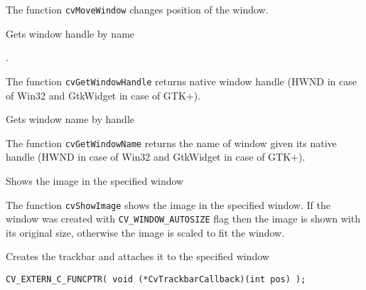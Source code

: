 The function \texttt{cvMoveWindow} changes position of the window.


Gets window handle by name


\begin{description}
.
\end{description}

The function \texttt{cvGetWindowHandle} returns native window handle (HWND in case of Win32 and GtkWidget in case of GTK+).


Gets window name by handle


\begin{description}
\end{description}

The function \texttt{cvGetWindowName} returns the name of window given its native handle (HWND in case of Win32 and GtkWidget in case of GTK+).


Shows the image in the specified window


\begin{description}
\end{description}

The function \texttt{cvShowImage} shows the image in the specified window. If the window was created with \texttt{CV\_WINDOW\_AUTOSIZE} flag then the image is shown with its original size, otherwise the image is scaled to fit the window.


Creates the trackbar and attaches it to the specified window

\begin{lstlisting}
CV_EXTERN_C_FUNCPTR( void (*CvTrackbarCallback)(int pos) );
\end{lstlisting}

